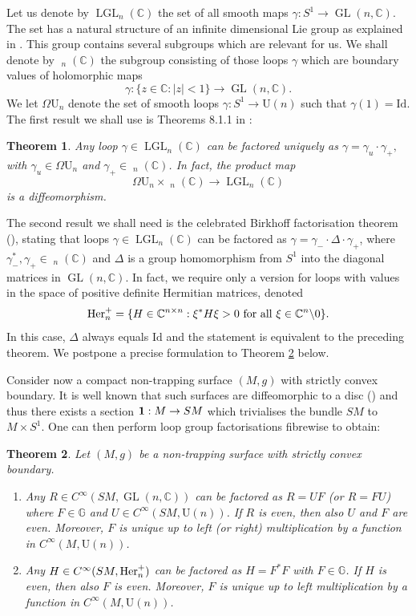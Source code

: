 \documentclass[JEP,XML,SOM,Unicode,published]{cedram}
\DeclareMathOperator{\GL}{GL}
\DeclareMathOperator{\LGL}{LGL}
\DeclareMathOperator{\LpGL}{L^+GL}
\newcommand{\rU}{\mathrm{U}}
\theoremstyle{plain}
\newtheorem{theorem}{Theorem}[section]
\theoremstyle{definition}
\newcommand{\G}{\mathbb{G}}
\newcommand{\C}{\mathbb{C}}
\newcommand{\he}{\textup{Her}}
\newcommand{\Id}{\mathrm{Id}}
\newcommand{\1}{{\bf 1}}
\begin{document}
Let us denote by $\LGL_{n}(\C)$ the set of all smooth maps $\gamma:S^{1}\to \GL(n,\C)$. The set has a natural structure of an infinite dimensional Lie group as explained in \cite[\S 3.2]{PS86}. This group contains several subgroups which are relevant for us. We shall denote by $\LpGL_{n}(\C)$ the subgroup consisting of those
loops $\gamma$ which are boundary values of holomorphic maps
\[\gamma:\{z\in\C:|z|<1\}\to \GL(n,\C).\]
We let $\Omega\rU_{n}$ denote the set of smooth loops $\gamma:S^{1}\to \rU(n)$ such that $\gamma(1)=\text{Id}$.
The first result we shall use is Theorems 8.1.1 in \cite{PS86}:

\begin{theorem} Any loop $\gamma\in \LGL_{n}(\C)$ can be factored uniquely as
$ \gamma=\gamma_{u}\cdot \gamma_{+},$
with $\gamma_{u}\in\Omega\rU_{n}$ and $\gamma_{+}\in \LpGL_{n}(\C)$. In fact, the product map
\begin{equation*}\Omega\rU_{n}\times \LpGL_{n}(\C)\to \LGL_{n}(\C)\end{equation*}
is a diffeomorphism.
\label{thm:PS}
\end{theorem}

The second result we shall need is the celebrated Birkhoff factorisation theorem (\cf \cite[Th.\,8.1.1]{PS86}), stating that loops $\gamma\in \LGL_n(\C)$ can be factored as $\gamma=\gamma_- \cdot \Delta \cdot \gamma_+$, where $\gamma_-^*,\gamma_+\in \LpGL_n(\C)$ and $\Delta$ is a group homomorphism from $S^1$ into the diagonal matrices in $\GL(n,\C)$. In fact, we require only a version for loops with values in the space of positive definite Hermitian matrices, denoted
\begin{equation*}
\he_n^+=\{H\in \C^{n \times n}: \xi^* H \xi >0 \text{ for all } \xi \in \C^n\backslash 0\}.
\end{equation*}
In this case, $\Delta$ always equals $\Id$ and the statement is equivalent to the preceding theorem. We postpone a precise formulation to Theorem \ref{thmfac} below.

Consider now a compact non-trapping surface $(M,g)$ with strictly convex boundary. It is well known that
such surfaces are diffeomorphic to a disc (\cf \cite{PSU20}) and thus there exists a section $\1:M\to SM$ which trivialises the bundle $SM$ to $M\times S^1$. One can then perform loop group factorisations fibrewise to obtain:

\begin{theorem}\label{thmfac} Let $(M,g)$ be a non-trapping surface with strictly convex boundary.
\begin{enumerate}
\item \label{fac2} Any $R\in C^\infty(SM,\GL(n,\C))$ can be factored as $R=UF$ (or $R=FU$) where $F\in \G$ and $U\in C^\infty(SM,\rU(n))$. If $R$ is even, then also $U$ and $F$ are even. Moreover, $F$ is unique up to left (or right) multiplication by a function in $C^\infty(M,\rU(n))$.
\item \label{fac1} Any $H\in C^\infty(SM,\he^+_n)$ can be factored as $H=F^*F$ with $F\in \G$. If $H$ is even, then also $F$ is even. Moreover, $F$ is unique up to left multiplication by a function in $C^\infty(M,\rU(n))$.
\end{enumerate}
\end{theorem}
\end{document}
